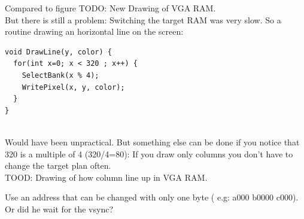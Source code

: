 \documentclass[book.tex]{subfiles}
\begin{document}
Compared to figure 
TODO: New Drawing of VGA RAM.\\
But there is still a problem: Switching the target RAM was very slow. So a routine drawing an horizontal line on the screen:

\begin{verbatim}
void DrawLine(y, color) {
  for(int x=0; x < 320 ; x++) {
    SelectBank(x % 4);
    WritePixel(x, y, color);   
  }
}
\end{verbatim}\\
Would have been unpractical. But something else can be done if you notice that 320 is a multiple of 4 (320/4=80): If you draw only columns you don't have to change the target plan often.\\
TOOD: Drawing of how column line up in VGA RAM.\\

 \par
 Use an address that can be changed with only one byte ( e.g: a000 b0000 c000).\\
 Or did he wait for the vsync?\\
\end{document}
